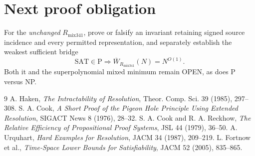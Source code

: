 \documentclass[11pt]{article}
\begin{document}
\section*{Next proof obligation}
For the \emph{unchanged} $R_{\mathrm{mix341}}$, prove or falsify an invariant retaining signed source incidence and every permitted representation, and separately establish the weakest sufficient bridge
\[
\mathrm{SAT}\in\mathrm P\Longrightarrow \overline W_{R_{\mathrm{mix341}}}(N)=N^{O(1)}.
\]
Both it and the superpolynomial mixed minimum remain OPEN, as does P versus NP.
\begin{thebibliography}{9}
 A. Haken, \emph{The Intractability of Resolution}, Theor. Comp. Sci. 39 (1985), 297--308.
 S. A. Cook, \emph{A Short Proof of the Pigeon Hole Principle Using Extended Resolution}, SIGACT News 8 (1976), 28--32.
 S. A. Cook and R. A. Reckhow, \emph{The Relative Efficiency of Propositional Proof Systems}, JSL 44 (1979), 36--50.
 A. Urquhart, \emph{Hard Examples for Resolution}, JACM 34 (1987), 209--219.
 L. Fortnow et al., \emph{Time-Space Lower Bounds for Satisfiability}, JACM 52 (2005), 835--865.
\end{thebibliography}
\end{document}
